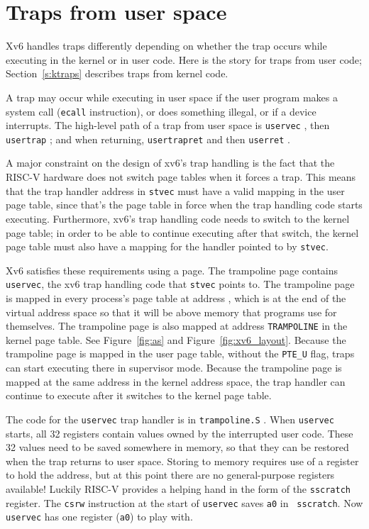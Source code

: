 \section{Traps from user space}

Xv6 handles traps differently depending on whether
the trap occurs while
executing in the kernel or in user code. Here is the
story for traps from user code; Section~\ref{s:ktraps}
describes traps from kernel code.

A trap may occur while executing in user space if the
user program makes a
system call ({\tt ecall} instruction), or does something
illegal, or if a device interrupts.
The high-level path of a trap from user space is
{\tt uservec}
,
then {\tt usertrap}
;
and when returning,
{\tt usertrapret}
and then
{\tt userret}
.


A major constraint on the design of xv6's trap handling is the fact
that the RISC-V hardware does not switch page tables when it forces a
trap. This means that the trap handler
address in {\tt stvec} must have a valid
mapping in the user page table, since that's the page table in force
when the trap handling code starts executing. Furthermore, xv6's trap
handling code needs to switch to the kernel page table; in order to be
able to continue executing after that switch, the kernel page table
must also have a mapping for the handler pointed to by {\tt stvec}.

Xv6 satisfies these requirements using a  page.
The trampoline page contains {\tt uservec}, the xv6 trap handling code
that {\tt stvec} points to. The trampoline page is mapped in
every process's page table at address
,
which is at the end of the virtual address space so that it will
be above memory that programs use for themselves.
The trampoline page is also mapped at address {\tt TRAMPOLINE}
in the kernel page table. See Figure~\ref{fig:as} and
Figure~\ref{fig:xv6_layout}. Because the trampoline page is mapped in
the user page table, without the {\tt PTE\_U} flag, traps can start
executing there in supervisor mode. Because the trampoline page is
mapped at the same address in the kernel address space, the trap handler
can continue to execute after it switches to the kernel page
table.

The code for the {\tt uservec} trap handler is in {\tt trampoline.S}
.
When {\tt uservec} starts, all 32 registers contain values owned by
the interrupted user code. These 32 values need to be saved somewhere
in memory, so that
they can be restored when the trap returns to user space.
Storing to memory requires use of a register
to hold the address,
but at this point there are no general-purpose registers available!
Luckily RISC-V provides a helping hand in the
form of the {\tt sscratch} register. The {\tt csrw} instruction at
the start of {\tt uservec} saves {\tt a0} in {\tt
  sscratch}. Now 
{\tt uservec} has
one register ({\tt a0}) to play with.

